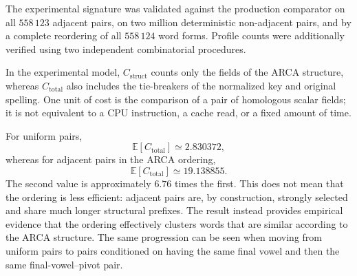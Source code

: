 \documentclass[11pt,a4paper]{article}
\theoremstyle{definition}
\theoremstyle{remark}
\begin{document}
The experimental signature was validated against the production comparator on all $558\,123$ adjacent pairs, on two million deterministic non-adjacent pairs, and by a complete reordering of all $558\,124$ word forms. Profile counts were additionally verified using two independent combinatorial procedures.

In the experimental model, $C_{\mathrm{struct}}$ counts only the fields of the ARCA structure, whereas $C_{\mathrm{total}}$ also includes the tie-breakers of the normalized key and original spelling. One unit of cost is the comparison of a pair of homologous scalar fields; it is not equivalent to a CPU instruction, a cache read, or a fixed amount of time.

\begin{table}[htbp]
\centering
\caption{Empirical distribution of $C_{\mathrm{total}}$ for different pair populations.}
\label{tab:costo-empirico}
\end{table}

For uniform pairs,
\[
  \mathbb{E}[C_{\mathrm{total}}]\simeq2.830372,
\]
whereas for adjacent pairs in the ARCA ordering,
\[
  \mathbb{E}[C_{\mathrm{total}}]\simeq19.138855.
\]
The second value is approximately $6.76$ times the first. This does not mean that the ordering is less efficient: adjacent pairs are, by construction, strongly selected and share much longer structural prefixes. The result instead provides empirical evidence that the ordering effectively clusters words that are similar according to the ARCA structure. The same progression can be seen when moving from uniform pairs to pairs conditioned on having the same final vowel and then the same final-vowel--pivot pair.
\end{document}
